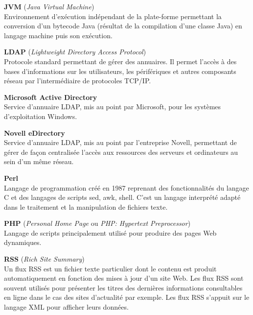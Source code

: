 \vspace{0.5cm}

\textbf{JVM} (\textit{Java Virtual Machine})\\
Environnement d'ex\'ecution ind\'ependant de la plate-forme permettant la conversion d'un bytecode Java (r\'esultat de la compilation d'une classe Java) en langage machine puis son ex\'ecution.

\vspace{0.5cm}

\textbf{LDAP} (\textit{Lightweight Directory Access Protocol})\\
Protocole standard permettant de g\'erer des annuaires. 
Il permet l'acc\`es \`a des bases d'informations sur les utilisateurs, les p\'erif\'eriques et autres composants r\'eseau par l'interm\'ediaire de protocoles TCP/IP.

\vspace{0.5cm}

\textbf{Microsoft Active Directory}\\
Service d'annuaire LDAP, mis au point par Microsoft, pour les syst\`emes d'exploitation Windows.

\vspace{0.5cm}

\textbf{Novell eDirectory}\\
Service d'annuaire LDAP, mis au point par l'entreprise Novell, permettant de g\'erer de fa\c{c}on centralis\'ee l'acc\`es aux ressources des serveurs et ordinateurs au sein d'un m\^eme r\'eseau.

\vspace{0.5cm}

\textbf{Perl}\\
Langage de programmation cr\'e\'e en 1987 reprenant des fonctionnalit\'es du langage C et des langages de scripts sed, awk, shell.
C'est un langage interpr\'et\'e adapt\'e dans le traitement et la manipulation de fichiers texte.

\vspace{0.5cm}

\textbf{PHP} (\textit{Personal Home Page} ou \textit{PHP: Hypertext Preprocessor})\\
Langage de scripts principalement utilis\'e pour produire des pages Web dynamiques.

\vspace{0.5cm}

\textbf{RSS} (\textit{Rich Site Summary})\\
Un flux RSS est un fichier texte particulier dont le contenu est produit automatiquement en fonction des mises \`a jour d'un site Web.
Les flux RSS sont souvent utilis\'es pour pr\'esenter les titres des derni\`eres informations consultables en ligne dans le cas des sites d'actualit\'e par exemple.
Les flux RSS s'appuit sur le langage XML pour afficher leurs donn\'ees.

